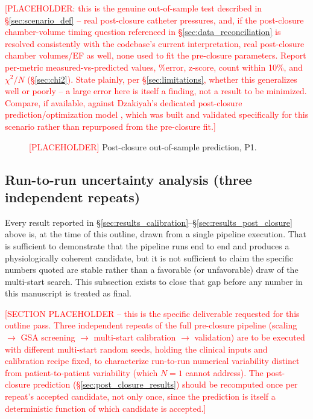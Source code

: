 \documentclass{article}
\begin{document}
\textcolor{red}{[PLACEHOLDER: this is the genuine out-of-sample test
described in \S\ref{sec:scenario_def} -- real post-closure catheter
pressures, and, if the post-closure chamber-volume timing question
referenced in \S\ref{sec:data_reconciliation} is resolved consistently
with the codebase's current interpretation, real post-closure chamber
volumes/EF as well, none used to fit the pre-closure parameters. Report
per-metric measured-vs-predicted values, \%error, z-score, count within
10\%, and $\chi^2/N$ (\S\ref{sec:chi2}). State plainly, per \S\ref{sec:limitations}, whether this generalizes well or poorly -- a large error
here is itself a finding, not a result to be minimized. Compare, if
available, against Dzakiyah's dedicated post-closure prediction/optimization
model \cite{Dzakiyah2026Thesis}, which was built and validated specifically
for this scenario rather than repurposed from the pre-closure fit.]}

\begin{figure}[h]
    \centering
    \caption{\textcolor{red}{[PLACEHOLDER]} Post-closure out-of-sample prediction, P1.}
    \label{fig:post_closure_prediction}
\end{figure}

\subsection{Run-to-run uncertainty analysis (three independent repeats)}
\label{sec:uncertainty}

Every result reported in \S\ref{sec:results_calibration}--\S\ref{sec:results_post_closure} above is, at the time of this outline, drawn from a single pipeline execution. That is sufficient to demonstrate that the pipeline runs end to end and produces a physiologically coherent candidate, but it is not sufficient to claim the specific numbers quoted are stable rather than a favorable (or unfavorable) draw of the multi-start search. This subsection exists to close that gap before any number in this manuscript is treated as final.

\textcolor{red}{[SECTION PLACEHOLDER -- this is the specific deliverable
requested for this outline pass. Three independent repeats of the full
pre-closure pipeline (scaling $\to$ GSA screening $\to$ multi-start
calibration $\to$ validation) are to be executed with different
multi-start random seeds, holding the clinical inputs and calibration
recipe fixed, to characterize run-to-run numerical variability distinct
from patient-to-patient variability (which $N=1$ cannot address). The
post-closure prediction (\S\ref{sec:post_closure_results}) should be
recomputed once per repeat's accepted candidate, not only once, since the
prediction is itself a deterministic function of which candidate is
accepted.]}
\end{document}
